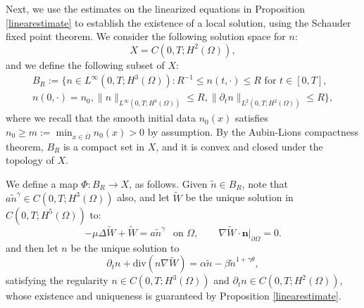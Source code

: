 \documentclass[12pt]{article}
\newcommand{\bd}{\boldsymbol}
\theoremstyle{plain}
\begin{document}
Next, we use the estimates on the linearized equations in Proposition \ref{linearestimate} to establish the existence of a local solution, using the Schauder fixed point theorem. We consider the following solution space for $n$:
\begin{equation*}
X = C(0, T; H^{2}(\Omega)),
\end{equation*}
and we define the following subset of $X$:
\begin{multline}\label{BRdef}
B_{R} := \{n \in L^{\infty}(0, T; H^{3}(\Omega)) : R^{-1} \le n(t, \cdot) \le R \text{ for $t \in [0, T]$}, \\
n(0, \cdot) = n_{0}, \|n\|_{L^{\infty}(0, T; H^{3}(\Omega))} \le R, \|\partial_{t}n\|_{L^{2}(0, T; H^{2}(\Omega))} \le R\},
\end{multline}
where we recall that the smooth initial data $n_{0}(x)$ satisfies $n_{0} \ge m := \min_{x \in \overline{\Omega}} n_{0}(x) > 0$ by assumption. By the Aubin-Lions compactness theorem, $B_{R}$ is a compact set in $X$, and it is convex and closed under the topology of $X$.

We define a map $\Phi: B_{R} \to X$, as follows. Given $\tilde{n} \in B_{R}$, note that $a\tilde{n}^{\gamma} \in C(0, T; H^{3}(\Omega))$ also, and let $\tilde{W}$ be the unique solution in $C(0, T; H^{5}(\Omega))$ to:
\begin{equation}\label{phidef1}
-\mu \Delta \tilde{W} + \tilde{W} = a\tilde{n}^{\gamma} \ \ \text{ on } \Omega, \qquad \nabla \tilde{W} \cdot \bd{n} |_{\partial \Omega} = 0.
\end{equation}
and then let $n$ be the unique solution to
\begin{equation}\label{phidef2}
\partial_{t}n + \text{div}(n\nabla \tilde{W}) = \alpha \tilde{n} - \beta \tilde{n}^{1 + \gamma \theta},
\end{equation}
satisfying the regularity $n \in C(0, T; H^{3}(\Omega))$ and $\partial_{t} n \in C(0, T; H^{2}(\Omega))$, whose existence and uniqueness is guaranteed by Proposition \ref{linearestimate}. 
\end{document}

